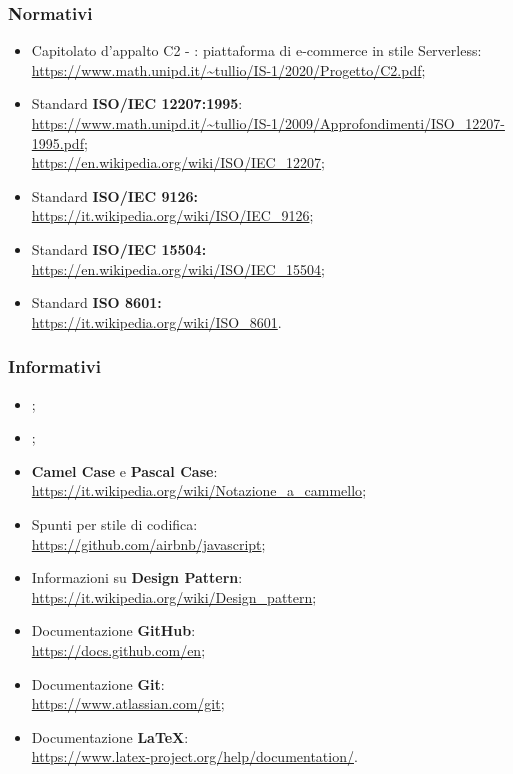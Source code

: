 \subsubsection{Normativi}
\begin{itemize}
\item Capitolato d'appalto C2 - \nameproject{}: piattaforma di e-commerce in stile Serverless:\\ \url{https://www.math.unipd.it/~tullio/IS-1/2020/Progetto/C2.pdf};
\item Standard \textbf{ISO/IEC 12207:1995}:\\ \url{https://www.math.unipd.it/~tullio/IS-1/2009/Approfondimenti/ISO_12207-1995.pdf};\\
\url{https://en.wikipedia.org/wiki/ISO/IEC_12207};
\item Standard \textbf{ISO/IEC 9126: }\\ \url{https://it.wikipedia.org/wiki/ISO/IEC_9126};
\item Standard \textbf{ISO/IEC 15504: }\\ \url{https://en.wikipedia.org/wiki/ISO/IEC_15504};
\item Standard \textbf{ISO 8601: }\\ \url{https://it.wikipedia.org/wiki/ISO_8601}.
\end{itemize}

\subsubsection{Informativi}
\begin{itemize}
\item {};
\item {};
\item \textbf{Camel Case} e \textbf{Pascal Case}:\\ \url{https://it.wikipedia.org/wiki/Notazione_a_cammello};
\item Spunti per stile di codifica:\\ \url{https://github.com/airbnb/javascript};
\item Informazioni su \textbf{Design Pattern}:\\ \url{https://it.wikipedia.org/wiki/Design_pattern};
\item Documentazione \textbf{GitHub}:\\ \url{https://docs.github.com/en};
\item Documentazione \textbf{Git}:\\ \url{https://www.atlassian.com/git};
\item Documentazione \textbf{\LaTeX}:\\ \url{https://www.latex-project.org/help/documentation/}.
\end{itemize}
